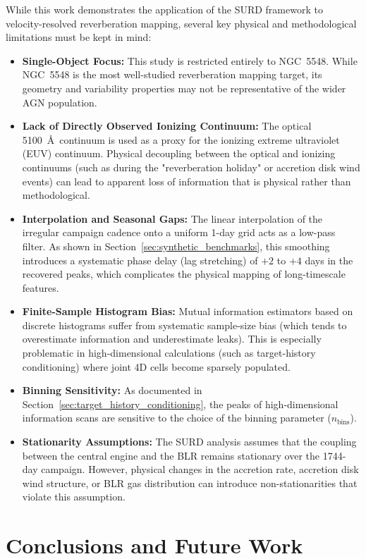 \documentclass[fleqn,usenatbib]{mnras}
\begin{document}
While this work demonstrates the application of the SURD framework to velocity-resolved reverberation mapping, several key physical and methodological limitations must be kept in mind:
\begin{itemize}
\item \textbf{Single-Object Focus:} This study is restricted entirely to NGC~5548. While NGC~5548 is the most well-studied reverberation mapping target, its geometry and variability properties may not be representative of the wider AGN population.
\item \textbf{Lack of Directly Observed Ionizing Continuum:} The optical 5100~\AA\ continuum is used as a proxy for the ionizing extreme ultraviolet (EUV) continuum. Physical decoupling between the optical and ionizing continuums (such as during the "reverberation holiday" or accretion disk wind events) can lead to apparent loss of information that is physical rather than methodological.
\item \textbf{Interpolation and Seasonal Gaps:} The linear interpolation of the irregular campaign cadence onto a uniform 1-day grid acts as a low-pass filter. As shown in Section~\ref{sec:synthetic_benchmarks}, this smoothing introduces a systematic phase delay (lag stretching) of $+2$ to $+4$ days in the recovered peaks, which complicates the physical mapping of long-timescale features.
\item \textbf{Finite-Sample Histogram Bias:} Mutual information estimators based on discrete histograms suffer from systematic sample-size bias (which tends to overestimate information and underestimate leaks). This is especially problematic in high-dimensional calculations (such as target-history conditioning) where joint 4D cells become sparsely populated.
\item \textbf{Binning Sensitivity:} As documented in Section~\ref{sec:target_history_conditioning}, the peaks of high-dimensional information scans are sensitive to the choice of the binning parameter ($n_{\mathrm{bins}}$).
\item \textbf{Stationarity Assumptions:} The SURD analysis assumes that the coupling between the central engine and the BLR remains stationary over the 1744-day campaign. However, physical changes in the accretion rate, accretion disk wind structure, or BLR gas distribution can introduce non-stationarities that violate this assumption.
\end{itemize}

\section{Conclusions and Future Work}
\label{sec:conclusion}
\end{document}
